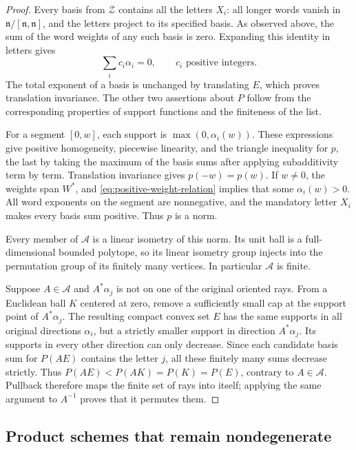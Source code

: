 \begin{proof}
Every basis from $\mathcal Z$ contains all the letters $X_i$:
all longer words vanish in $\mathfrak n/[\mathfrak n,\mathfrak n]$,
and the letters project to its specified basis. As observed above,
the sum of the word weights of any such basis is zero. Expanding this
identity in letters gives
\begin{equation}\label{eq:positive-weight-relation}
 \sum_i c_i\alpha_i=0,\qquad c_i\text{ positive integers}.
\end{equation}
The total exponent of a basis is unchanged by translating $E$, which
proves translation invariance. The other two assertions about $P$
follow from the corresponding properties of support functions and the
finiteness of the list.

For a segment $[0,w]$, each support is $\max(0,\alpha_i(w))$.
These expressions give positive homogeneity, piecewise linearity,
and the triangle inequality for $p$, the last by taking the maximum
of the basis sums after applying subadditivity term by term.
Translation invariance gives $p(-w)=p(w)$. If $w\ne0$, the weights
span $W^*$, and \eqref{eq:positive-weight-relation} implies that some
$\alpha_i(w)>0$. All word exponents on the segment are nonnegative,
and the mandatory letter $X_i$ makes every basis sum positive.
Thus $p$ is a norm.

Every member of $\mathcal A$ is a linear isometry of this norm.
Its unit ball is a full-dimensional bounded polytope, so its linear
isometry group injects into the permutation group of its finitely many
vertices. In particular $\mathcal A$ is finite.

Suppose $A\in\mathcal A$ and $A^*\alpha_j$ is not on one of the
original oriented rays. From a Euclidean ball $K$ centered at zero, remove
a sufficiently small cap at the support point of $A^*\alpha_j$.
The resulting compact convex set $E$ has the same supports in all
original directions $\alpha_i$, but a strictly smaller support in
direction $A^*\alpha_j$. Its supports in every other direction can
only decrease. Since each candidate basis sum for $P(AE)$ contains
the letter $j$, all these finitely many sums decrease strictly.
Thus $P(AE)<P(AK)=P(K)=P(E)$, contrary to $A\in\mathcal A$.
Pullback therefore maps the finite set of rays into itself; applying the
same argument to $A^{-1}$ proves that it permutes them.
\end{proof}

\subsection{Product schemes that remain nondegenerate}

